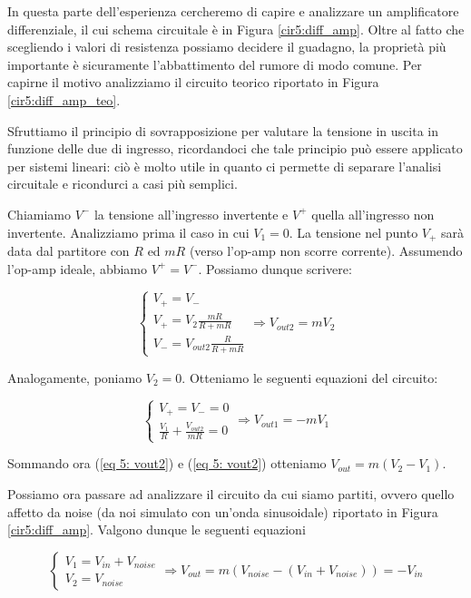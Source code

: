In questa parte dell'esperienza cercheremo di capire e analizzare un amplificatore differenziale, il cui schema circuitale è in Figura \ref{cir5:diff_amp}. Oltre al fatto che scegliendo i valori di resistenza possiamo decidere il guadagno, la proprietà più importante è sicuramente l'abbattimento del rumore di modo comune. Per capirne il motivo analizziamo il circuito teorico riportato in Figura \ref{cir5:diff_amp_teo}.

Sfruttiamo il principio di sovrapposizione per valutare la tensione in uscita in funzione delle due di ingresso, ricordandoci che tale principio può essere applicato per sistemi lineari: ciò è molto utile in quanto ci permette di separare l'analisi circuitale e ricondurci a casi più semplici.

Chiamiamo $V^-$ la tensione all'ingresso invertente e $V^+$ quella all'ingresso non invertente. Analizziamo prima il caso in cui $V_1=0$. La tensione nel punto $V_+$ sarà data dal partitore con $R$ ed $mR$ (verso l'op-amp non scorre corrente). Assumendo l'op-amp ideale, abbiamo $V^+=V^-$. Possiamo dunque scrivere:

\begin{equation}
\begin{cases} V_+=V_-  \\ V_+=V_2\frac{mR}{R+mR} \\ V_-= V_{out2}\frac{R}{R+mR}\end{cases}  \Rightarrow V_{out2}=mV_2
\label{eq 5: vout2}
\end{equation}

Analogamente, poniamo $V_2=0$. Otteniamo le seguenti equazioni del circuito:

\begin{equation}
\begin{cases} V_+=V_-=0  \\ \frac{V_1}{R}+\frac{V_{out2}}{mR}=0 \end{cases}  \Rightarrow V_{out1}=-mV_1
\label{eq 5: vout1}
\end{equation}

Sommando ora (\ref{eq 5: vout2}) e (\ref{eq 5: vout2}) otteniamo $V_{out}=m(V_2-V_1)$.

Possiamo ora passare ad analizzare il circuito da cui siamo partiti, ovvero quello affetto da noise (da noi simulato con un'onda sinusoidale) riportato in Figura \ref{cir5:diff_amp}. Valgono dunque le seguenti equazioni

$$
\begin{cases} V_1=V_{in}+V_{noise} \\ V_2=V_{noise} \end{cases}  \Rightarrow V_{out}=m(V_{noise}-(V_{in}+V_{noise}))=-V_{in}
$$

